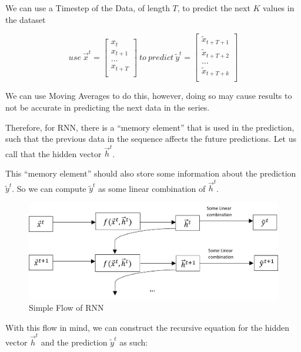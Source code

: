 \documentclass[
]{article}
\begin{document}
We can use a Timestep of the Data, of length \(T\), to predict the next
\(K\) values in the dataset

\[use\ {\overrightarrow{x}}^{t} = \begin{bmatrix}
x_{t} \\
x_{t + 1} \\
\ldots \\
x_{t + T} \\
\end{bmatrix}\ to\ predict\ {\widetilde{y}}^{t} = \begin{bmatrix}
{\widetilde{x}}_{t + T + 1} \\
{\widetilde{x}}_{t + T + 2} \\
\ldots \\
{\widetilde{x}}_{t + T + k} \\
\end{bmatrix}\]

We can use Moving Averages to do this, however, doing so may cause
results to not be accurate in predicting the next data in the series.

Therefore, for RNN, there is a ``memory element'' that is used in the
prediction, such that the previous data in the sequence affects the
future predictions. Let us call that the hidden vector
\({\overrightarrow{h}}^{t}\).

This ``memory element'' should also store some information about the
prediction \({\widetilde{y}}^{t}\). So we can compute
\({\widetilde{y}}^{t}\) as some linear combination of
\({\overrightarrow{h}}^{t}\).

\begin{figure}
\includegraphics[width=1.5\linewidth]{Simple_Flow} \caption{Simple Flow of RNN}\label{fig:unnamed-chunk-2}
\end{figure}

With this flow in mind, we can construct the recursive equation for the
hidden vector \({\overrightarrow{h}}^{t}\) and the prediction
\({\widetilde{y}}^{t}\) as such:
\end{document}
